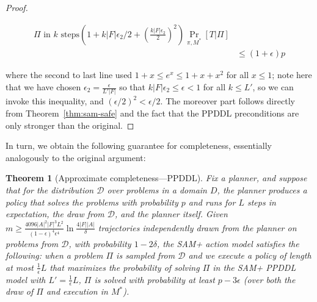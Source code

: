 \documentclass[letterpaper]{article} %
\newtheorem{theorem}{Theorem}
\begin{document}
\begin{proof}
\begin{small}
\begin{align*}
{{\Pi\text{ in }k\text{ steps}}}(1+k|F|\epsilon_2/2+\left(\frac{k|F|\epsilon_2}{2}\right)^2)\Pr_{\pi,M^*}[T|\Pi]\\
&\leq (1+\epsilon)p
\end{align*}
\end{small}
where the second to last line used
$
1+x\leq e^x\leq 1+x+x^2
$
for all $x\leq 1$; note here that we have chosen $\epsilon_2=\frac{\epsilon}{L'|F|}$ so that $k|F|\epsilon_2\leq \epsilon < 1$ for all $k\leq L'$, so we can invoke this inequality, and $(\epsilon/2)^2<\epsilon/2$. The moreover part follows directly from Theorem~\ref{thm:sam-safe} and the fact that the PPDDL preconditions are only stronger than the original.
\end{proof}

In turn, we obtain the following guarantee for completeness, essentially analogously to the original argument:
\begin{theorem}[Approximate completeness---PPDDL]
\label{thm:ppddl-sam-ac}
Fix a planner, and suppose that for the distribution $\mathcal{D}$ over problems in a domain $D$, the planner produces a policy that solves the problems with probability $p$ and runs for $L$ steps in expectation, the draw from $\mathcal{D}$, and the planner itself.
Given 
$
m\geq \frac{4096|A|^2|F|^3L^2}{(1-\epsilon)^4\epsilon^4}\ln\frac{4|F||A|}{\delta}
$
trajectories independently drawn from the planner on problems from $\mathcal{D}$, with probability $1-2\delta$, the SAM+ action model satisfies the following:  when a problem $\Pi$ is sampled from $\mathcal{D}$ and we execute a policy of length at most $\frac{1}{\epsilon}L$ that maximizes the probability of solving $\Pi$ in the SAM+ PPDDL model with $L'=\frac{1}{\epsilon}L$, $\Pi$ is solved with probability at least $p-3\epsilon$ (over both the draw of $\Pi$ and execution in $M^*$).
\end{theorem}
\end{document}
